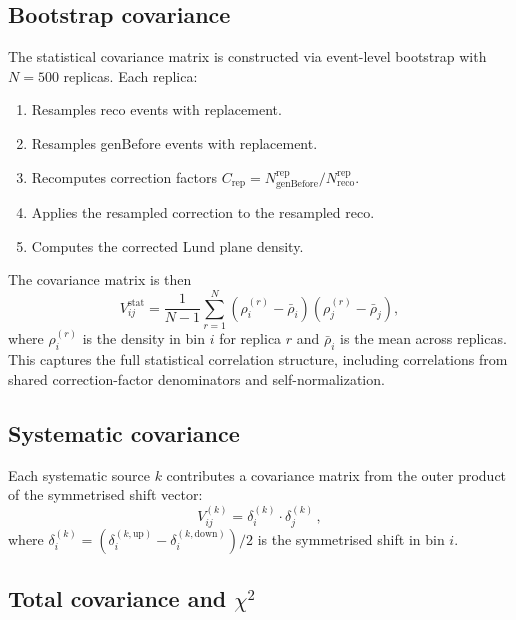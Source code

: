 \documentclass[11pt,a4paper]{article}
\begin{document}
\subsection{Bootstrap covariance}
\label{sec:bootstrap}

The statistical covariance matrix is constructed via event-level
bootstrap with $N = 500$ replicas.  Each replica:
\begin{enumerate}
\item Resamples reco events with replacement.
\item Resamples genBefore events with replacement.
\item Recomputes correction factors
  $C_\text{rep} = N_\text{genBefore}^\text{rep} /
  N_\text{reco}^\text{rep}$.
\item Applies the resampled correction to the resampled reco.
\item Computes the corrected Lund plane density.
\end{enumerate}

The covariance matrix is then
\begin{equation}
  V_{ij}^\text{stat} = \frac{1}{N-1}
  \sum_{r=1}^{N}
  \left(\rho_i^{(r)} - \bar{\rho}_i\right)
  \left(\rho_j^{(r)} - \bar{\rho}_j\right),
  \label{eq:bootstrap-cov}
\end{equation}
where $\rho_i^{(r)}$ is the density in bin $i$ for replica $r$ and
$\bar{\rho}_i$ is the mean across replicas.  This captures the full
statistical correlation structure, including correlations from shared
correction-factor denominators and self-normalization.

\subsection{Systematic covariance}
\label{sec:syst-cov}

Each systematic source $k$ contributes a covariance matrix from the
outer product of the symmetrised shift vector:
\begin{equation}
  V_{ij}^{(k)} = \delta_i^{(k)} \cdot \delta_j^{(k)}\,,
  \label{eq:syst-cov}
\end{equation}
where $\delta_i^{(k)} = (\delta_i^{(k,\text{up})} -
\delta_i^{(k,\text{down})}) / 2$ is the symmetrised shift in bin $i$.

\subsection{Total covariance and $\chi^2$}
\label{sec:total-cov}
\end{document}
